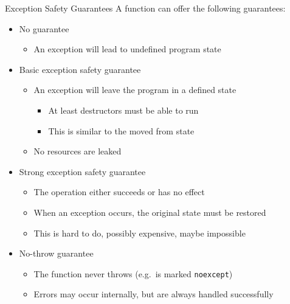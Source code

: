 \begin{frame}[fragile]
  \begin{block}{Exception Safety Guarantees}
    A function can offer the following guarantees:
    \begin{itemize}
      \item No guarantee
      \begin{itemize}
        \item An exception will lead to undefined program state
      \end{itemize}
      \item Basic exception safety guarantee
      \begin{itemize}
        \item An exception will leave the program in a defined state
        \begin{itemize}
          \item At least destructors must be able to run
          \item This is similar to the moved from state
        \end{itemize}
        \item No resources are leaked
      \end{itemize}
      \item Strong exception safety guarantee
      \begin{itemize}
        \item The operation either succeeds or has no effect
        \item When an exception occurs, the original state must be restored
        \item This is hard to do, possibly expensive, maybe impossible
      \end{itemize}
      \item No-throw guarantee
      \begin{itemize}
        \item The function never throws (e.g.\ is marked \texttt{noexcept})
        \item Errors may occur internally, but are always handled successfully
      \end{itemize}
    \end{itemize}
  \end{block}
\end{frame}

